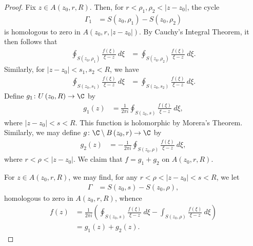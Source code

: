\documentclass[10pt]{mypackage}
\begin{document}
\begin{proof}
  Fix $z\in A\left( z_0,r,R \right)$. Then, for $r < \rho_1,\rho_2 < \left\vert z-z_0 \right\vert$, the cycle
  \begin{align*}
    \Gamma_1 &= S\left( z_0,\rho_1 \right) - S\left( z_0,\rho_2 \right)
  \end{align*}
  is homologous to zero in $A\left( z_0,r,\left\vert z-z_0 \right\vert \right)$. By Cauchy's Integral Theorem, it then follows that
  \begin{align*}
    \oint_{S\left( z_0,\rho_1 \right)}^{} \frac{f\left( \xi \right)}{\xi-z}\:d\xi &= \oint_{S\left( z_0,\rho_2 \right)}^{} \frac{f\left( \xi \right)}{\xi-z}\:d\xi.
  \end{align*}
  Similarly, for $\left\vert z-z_0 \right\vert < s_1,s_2 < R$, we have
  \begin{align*}
    \oint_{S\left( z_0,s_1 \right)}^{} \frac{f\left( \xi \right)}{\xi-z}\:d\xi &= \oint_{S\left( z_0,s_2 \right)}^{} \frac{f\left( \xi \right)}{\xi-z}\:d\xi.
  \end{align*}
  Define $g_1\colon U\left( z_0,R \right)\rightarrow \C$ by
  \begin{align*}
    g_1(z) &= \frac{1}{2\pi i} \oint_{S\left( z_0,s \right)}^{} \frac{f\left( \xi \right)}{\xi - z}\:d\xi,
  \end{align*}
  where $ \left\vert z-z_0 \right\vert < s < R $. This function is holomorphic by Morera's Theorem. Similarly, we may define $g\colon \C\setminus B\left( z_0,r \right)\rightarrow \C$ by
  \begin{align*}
    g_2\left( z \right) &= -\frac{1}{2\pi i} \oint_{S\left( z_0,\rho \right)}^{} \frac{f\left( \xi \right)}{\xi-z}\:d\xi,
  \end{align*}
  where $r < \rho < \left\vert z-z_0 \right\vert$. We claim that $f = g_1 + g_2$ on $A\left( z_0,r,R \right)$.\newline

  For $z\in A\left( z_0,r,R \right)$, we may find, for any $r < \rho < \left\vert z-z_0 \right\vert < s < R$, we let
  \begin{align*}
    \Gamma &= S\left( z_0,s \right) - S\left( z_0,\rho \right),
  \end{align*}
  homologous to zero in $A\left( z_0,r,R \right)$, whence
  \begin{align*}
    f\left( z \right) &= \frac{1}{2\pi i} \left( \oint_{S\left( z_0,s \right)}^{} \frac{f\left( \xi \right)}{\xi-z}\:d\xi - \int_{S\left( z_0,\rho \right)}^{} \frac{f\left( \xi \right)}{\xi - z}\:d\xi \right)\\
                      &= g_1\left( z \right) + g_2\left( z \right).
  \end{align*}
\end{proof}
\end{document}
